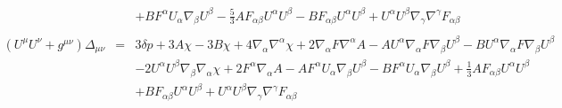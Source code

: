 \documentclass[10pt,letterpaper]{article}
\numberwithin{equation}{section}
\begin{document}
\begin{eqnarray}
&& + B F^{\alpha } U_{\alpha } \nabla_{\beta }U^{\beta }- \tfrac{5}{3} A F_{\alpha \beta } U^{\alpha } U^{\beta } -  B F_{\alpha \beta } U^{\alpha } U^{\beta } + U^{\alpha } U^{\beta } \nabla_{\gamma }\nabla^{\gamma }F_{\alpha \beta }
\\  \nonumber\\ 
(U^\mu U^\nu+g^{\mu\nu})\Delta_{\mu\nu}&=& 3 \delta p + 3 A \chi - 3 B \chi + 4 \nabla_{\alpha }\nabla^{\alpha }\chi + 2 \nabla_{\alpha }F \nabla^{\alpha }A -  A U^{\alpha } \nabla_{\alpha }F \nabla_{\beta }U^{\beta } -  B U^{\alpha } \nabla_{\alpha }F \nabla_{\beta }U^{\beta } \nonumber \\ 
&& - 2 U^{\alpha } U^{\beta } \nabla_{\beta }\nabla_{\alpha }\chi +2 F^{\alpha } \nabla_{\alpha }A -  A F^{\alpha } U_{\alpha } \nabla_{\beta }U^{\beta } -  B F^{\alpha } U_{\alpha } \nabla_{\beta }U^{\beta }+\tfrac{1}{3} A F_{\alpha \beta } U^{\alpha } U^{\beta } \nonumber \\ 
&& + B F_{\alpha \beta } U^{\alpha } U^{\beta } + U^{\alpha } U^{\beta } \nabla_{\gamma }\nabla^{\gamma }F_{\alpha \beta }
\end{eqnarray}
%
%
%
\newpage
\end{document}

